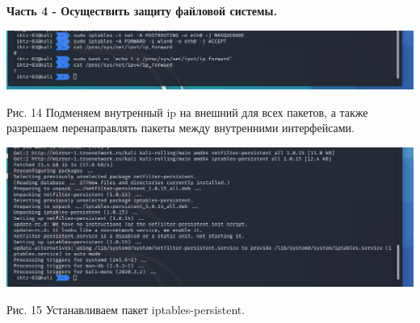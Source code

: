\documentclass[a4paper,14pt]{extarticle}
\begin{document}
   \textbf{Часть 4 - Осуществить защиту файловой системы.}
   \begin{center}
       
        \includegraphics[scale=0.45]{pics/14.png}

        \begin{singlespace}
            Рис. 14 Подменяем внутренный ip на внешний для всех пакетов, а также разрешаем
        \vspace{1ex}
            перенаправлять пакеты между внутренними интерфейсами.
        \end{singlespace}

        \includegraphics[scale=0.45]{pics/15.png}

        Рис. 15 Устанавливаем пакет iptables-persistent.
        \vspace{1ex}

   \end{center}
\end{document}
